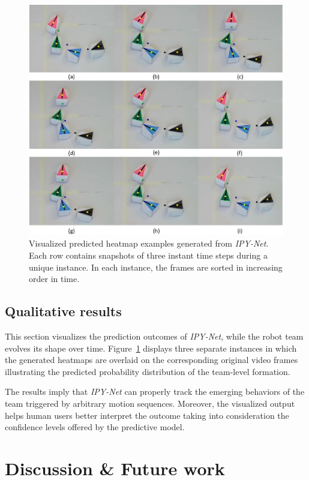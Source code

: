 \documentclass[letterpaper, 10 pt, conference]{ieeeconf}  %
\begin{document}
	
	\begin{figure}[t]
		\centering
		\includegraphics[width=.8\columnwidth]{fig_heatmap}
		\caption{Visualized predicted heatmap examples generated from \emph{IPY-Net}. 
			Each row contains snapshots of three instant time steps during a unique 
			instance. In each instance, the frames are sorted in increasing order in time. 			 
		}
		\label{fig:heatmap}
	\end{figure}

	
	\subsection{Qualitative results} 
	\label{sec:qualitative_results} 

	This section visualizes the prediction outcomes of \emph{IPY-Net}, while the robot team
	evolves its shape over time. Figure~\ref{fig:heatmap} displays three separate instances in which 
	the generated heatmaps are overlaid on the corresponding original video frames illustrating 
	the predicted probability distribution of the team-level formation. 
	
	The results imply that \emph{IPY-Net} can properly track the emerging behaviors of the team 
	triggered by arbitrary motion sequences. Moreover, the visualized output helps
	human users better interpret the outcome taking into consideration the confidence levels 
	offered by the predictive model. 
	

	\section{Discussion \& Future work}
	\label{sec:discussion_and_future_work}
	
\end{document}

